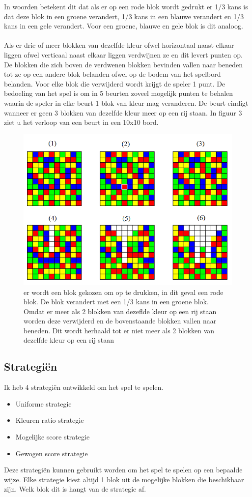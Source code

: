 \documentclass[12pt,a4paper,oneside]{book}
\begin{document}
In woorden betekent dit dat als er op een rode blok wordt gedrukt er 1/3 kans is dat deze blok in een groene verandert, 1/3 kans in een blauwe verandert en 1/3 kans in een gele verandert. Voor een groene, blauwe en gele blok is dit analoog.
\\\\
Als er drie of meer blokken van dezelfde kleur ofwel horizontaal naast elkaar liggen ofwel verticaal naast elkaar liggen verdwijnen ze en dit levert punten op. De blokken die zich boven de verdwenen blokken bevinden vallen naar beneden tot ze op een andere blok belanden ofwel op de bodem van het spelbord belanden. Voor elke blok die verwijderd wordt krijgt de speler 1 punt. De bedoeling van het spel is om in 5 beurten zoveel mogelijk punten te behalen waarin de speler in elke beurt 1 blok van kleur mag veranderen. De beurt eindigt wanneer er geen 3 blokken van dezelfde kleur meer op een rij staan. In figuur 3 ziet u het verloop van een beurt in een 10x10 bord.
\begin{figure}
	\centering
	\includegraphics[height=80truemm]{turn}
	\caption{er wordt een blok gekozen om op te drukken, in dit geval een rode blok. De blok verandert met een 1/3 kans in een groene blok. Omdat er meer als 2 blokken van dezeflde kleur op een rij staan worden deze verwijderd en de bovenstaande blokken vallen naar beneden. Dit wordt herhaald tot er niet meer als 2 blokken van dezelfde kleur op een rij staan}
	\label{figure:initialboard}
\end{figure}
\subsection{Strategi\"{e}n}
Ik heb 4 strategiën ontwikkeld om het spel te spelen.
\begin{itemize}
	\item Uniforme strategie
	\item Kleuren ratio strategie
	\item Mogelijke score strategie
	\item Gewogen score strategie
\end{itemize}
Deze strategiën kunnen gebruikt worden om het spel te spelen op een bepaalde wijze. Elke strategie kiest altijd 1 blok uit de mogelijke blokken die beschikbaar zijn. Welk blok dit is hangt van de strategie af.
\end{document}

